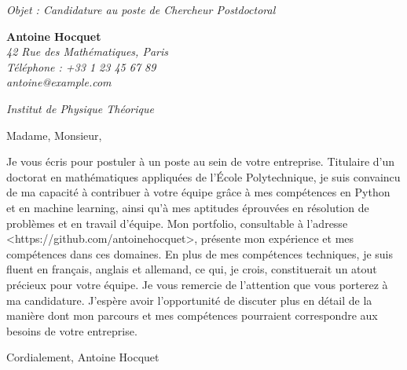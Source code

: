 \documentclass[12pt]{letter}
\begin{document}
\begin{letter}{ \itshape Objet : Candidature au poste de Chercheur Postdoctoral }
\hfill
\begin{flushleft}
    {\bfseries Antoine Hocquet }\\[.35ex]
    \small\itshape
    42 Rue des Mathématiques, Paris\\
    Téléphone : +33 1 23 45 67 89\\
    antoine@example.com
\end{flushleft}

\hfill
\begin{flushright}
    \itshape Institut de Physique Théorique \\
\end{flushright}

\opening{ Madame, Monsieur, }

Je vous écris pour postuler à un poste au sein de votre entreprise. Titulaire d'un doctorat en mathématiques appliquées de l'École Polytechnique, je suis convaincu de ma capacité à contribuer à votre équipe grâce à mes compétences en Python et en machine learning, ainsi qu'à mes aptitudes éprouvées en résolution de problèmes et en travail d'équipe. Mon portfolio, consultable à l'adresse <https://github.com/antoinehocquet>, présente mon expérience et mes compétences dans ces domaines.  En plus de mes compétences techniques, je suis fluent en français, anglais et allemand, ce qui, je crois, constituerait un atout précieux pour votre équipe. Je vous remercie de l'attention que vous porterez à ma candidature. J'espère avoir l'opportunité de discuter plus en détail de la manière dont mon parcours et mes compétences pourraient correspondre aux besoins de votre entreprise.

\closing{ Cordialement,
Antoine Hocquet }

\end{letter}
\end{document}
